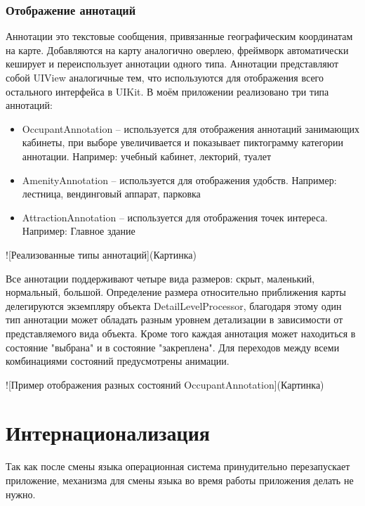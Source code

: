    \subsubsection{Отображение аннотаций}
      Аннотации это текстовые сообщения, привязанные географическим координатам на карте. Добавляются на карту аналогично оверлею, фреймворк автоматически кеширует и переиспользует аннотации одного типа. Аннотации представляют собой UIView аналогичные тем, что используются для отображения всего остального интерфейса в UIKit.
      В моём приложении реализовано три типа аннотаций:
      \begin{itemize}
        \item OccupantAnnotation -- используется для отображения аннотаций занимающих кабинеты, при выборе увеличивается и показывает пиктограмму категории аннотации. Например: учебный кабинет, лекторий, туалет
        \item AmenityAnnotation -- используется для отображения удобств. Например: лестница, вендинговый аппарат, парковка
        \item AttractionAnnotation -- используется для отображения точек интереса. Например: Главное здание
      \end{itemize}


      ![Реализованные типы аннотаций](Картинка)

      Все аннотации поддерживают четыре вида размеров: скрыт, маленький, нормальный, большой. Определение размера относительно приближения карты делегируются экземпляру объекта DetailLevelProcessor, благодаря этому один тип аннотации может обладать разным уровнем детализации в зависимости от представляемого вида объекта. Кроме того каждая аннотация может находиться в состояние "выбрана" и в состояние "закреплена". Для переходов между всеми комбинациями состояний предусмотрены анимации.

      ![Пример отображения разных состояний OccupantAnnotation](Картинка)

  \section{Интернационализация}
    Так как после смены языка операционная система принудительно перезапускает приложение, механизма для смены языка во время работы приложения делать не нужно.

